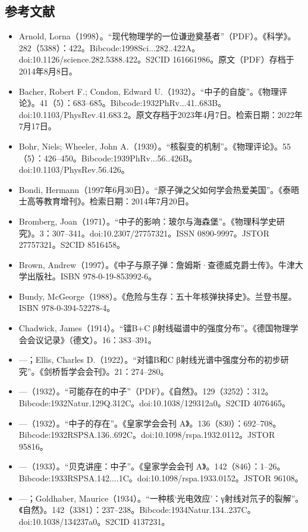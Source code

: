 \subsection{参考文献}
\begin{itemize}
\item Arnold, Lorna（1998）。“现代物理学的一位谦逊奠基者”（PDF）。《科学》。282（5388）：422。Bibcode:1998Sci...282..422A。doi:10.1126/science.282.5388.422。S2CID 161661986。原文（PDF）存档于2014年8月8日。
\item Bacher, Robert F.; Condon, Edward U.（1932）。“中子的自旋”。《物理评论》。41（5）：683–685。Bibcode:1932PhRv...41..683B。doi:10.1103/PhysRev.41.683.2。原文存档于2023年4月7日。检索日期：2022年7月17日。
\item Bohr, Niels; Wheeler, John A.（1939）。“核裂变的机制”。《物理评论》。55（5）：426–450。Bibcode:1939PhRv...56..426B。doi:10.1103/PhysRev.56.426。
\item Bondi, Hermann（1997年6月30日）。“原子弹之父如何学会热爱美国”。《泰晤士高等教育增刊》。检索日期：2014年7月20日。
\item Bromberg, Joan（1971）。“中子的影响：玻尔与海森堡”。《物理科学史研究》。3：307–341。doi:10.2307/27757321。ISSN 0890-9997。JSTOR 27757321。S2CID 8516458。
\item Brown, Andrew（1997）。《中子与原子弹：詹姆斯·查德威克爵士传》。牛津大学出版社。ISBN 978-0-19-853992-6。
\item Bundy, McGeorge（1988）。《危险与生存：五十年核弹抉择史》。兰登书屋。ISBN 978-0-394-52278-4。
\item Chadwick, James（1914）。“镭B+C β射线磁谱中的强度分布”。《德国物理学会会议记录》（德文）。16：383–391。
\item —；Ellis, Charles D.（1922）。“对镭B和C β射线光谱中强度分布的初步研究”。《剑桥哲学会会刊》。21：274–280。
\item —（1932）。“可能存在的中子”（PDF）。《自然》。129（3252）：312。Bibcode:1932Natur.129Q.312C。doi:10.1038/129312a0。S2CID 4076465。
\item —（1932）。“中子的存在”。《皇家学会会刊 A》。136（830）：692–708。Bibcode:1932RSPSA.136..692C。doi:10.1098/rspa.1932.0112。JSTOR 95816。
\item —（1933）。“贝克讲座：中子”。《皇家学会会刊 A》。142（846）：1–26。Bibcode:1933RSPSA.142....1C。doi:10.1098/rspa.1933.0152。JSTOR 96108。
\item —；Goldhaber, Maurice（1934）。“一种核‘光电效应’：γ射线对氘子的裂解”。《自然》。142（3381）：237–238。Bibcode:1934Natur.134..237C。doi:10.1038/134237a0。S2CID 4137231。

\end{itemize}
